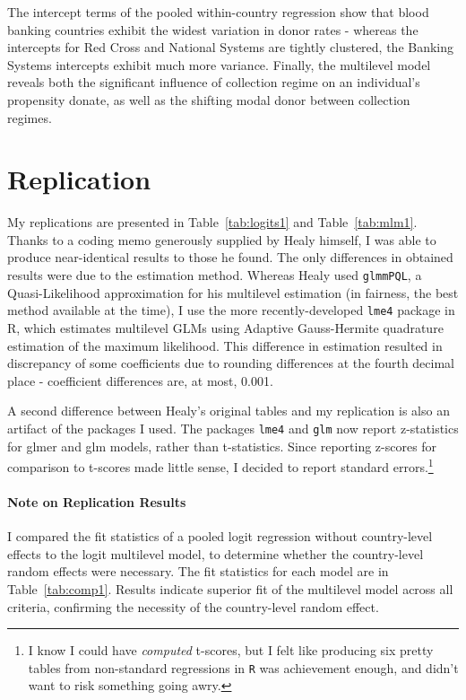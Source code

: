 \documentclass[11pt,article,oneside]{memoir}
\begin{document}
The intercept terms of the pooled within-country regression show that blood banking countries exhibit the widest variation in donor rates - whereas the intercepts for Red Cross and National Systems are tightly clustered, the Banking Systems intercepts exhibit much more variance. Finally, the multilevel model reveals both the significant influence of collection regime on an individual's propensity donate, as well as the shifting modal donor between collection regimes.


\section{Replication}\label{replication}

My replications are presented in Table~\ref{tab:logits1} and Table~\ref{tab:mlm1}. Thanks to a coding memo generously supplied by Healy himself, I was able to produce near-identical results to those he found. The only differences in obtained results were due to the estimation method. Whereas Healy used \texttt{glmmPQL}, a Quasi-Likelihood approximation for his multilevel estimation (in fairness, the best method available at the time), I use the more recently-developed \texttt{lme4} package in R, which estimates multilevel GLMs using Adaptive Gauss-Hermite quadrature estimation of the 
maximum likelihood. This difference in estimation resulted in discrepancy of some coefficients due to rounding differences at the fourth decimal place - coefficient differences are, at most, 0.001.

A second difference between Healy's original tables and my replication is also an artifact of the packages I used. The packages \texttt{lme4} and \texttt{glm} now report z-statistics for glmer and glm models, rather than t-statistics. Since reporting z-scores for comparison to t-scores made little sense, I decided to report standard errors.\footnote{I know I could have \emph{computed} t-scores, but I felt like producing six pretty tables from non-standard regressions in \texttt{R} was achievement enough, and didn't want to risk something going awry.}

\paragraph{Note on Replication Results}

I compared the fit statistics of a pooled logit regression without country-level effects to the logit multilevel model, to determine whether the country-level random effects were necessary. The fit statistics for each model are in Table~\ref{tab:comp1}. Results indicate superior fit of the multilevel model across all criteria, confirming the necessity of the country-level random effect. 
\end{document}

